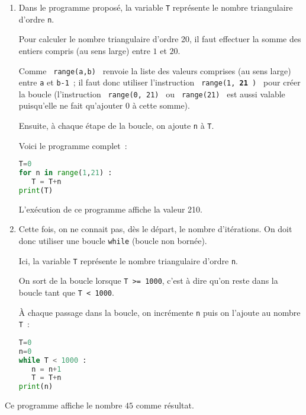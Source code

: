 \begin{corrige}
     \begin{enumerate}
          \item
          \par
          Dans le programme proposé, la variable \texttt{T} représente le nombre triangulaire d'ordre \texttt{n}.
          \par
          Pour calculer le nombre triangulaire d'ordre 20, il faut effectuer la somme des entiers compris (au sens large) entre $1$ et $20$.
          \par
          Comme \texttt{ range(a,b) } renvoie la liste des valeurs comprises (au sens large) entre \texttt{a} et \texttt{b-1}~; il faut donc utiliser l'instruction \texttt{ range(1, \textbf{21} ) } pour créer la boucle (l'instruction \texttt{ range(0, 21) } ou \texttt{ range(21) } est aussi valable puisqu'elle ne fait qu'ajouter $0$ à cette somme).
          \par
          Ensuite, à chaque étape de la boucle, on ajoute \texttt{n} à \texttt{T}.
          \par
          Voici le programme complet~:
\begin{lstlisting}[language=Python]
T=0
for n in range(1,21) :
   T = T+n
print(T)
     \end{lstlisting}
     L'exécution de ce programme affiche la valeur 210.
     \item
     Cette fois, on ne connait pas, dès le départ, le nombre d'itérations. On doit donc utiliser une boucle \texttt{while} (boucle non bornée).
     \par
     Ici, la variable \texttt{T} représente le nombre triangulaire d'ordre \texttt{n}.
     \par
     On sort de la boucle lorsque \texttt{T >= 1000}, c'est à dire qu'on reste dans la boucle tant que \texttt{T < 1000}.
     \par
     À chaque passage dans la boucle, on incrémente \texttt{n} puis on l'ajoute au nombre \texttt{T}~:
\begin{lstlisting}[language=Python]
T=0
n=0
while T < 1000 :
   n = n+1
   T = T+n
print(n)
\end{lstlisting}
\end{enumerate}
Ce programme affiche le nombre $ 45 $ comme résultat.
\end{corrige}
